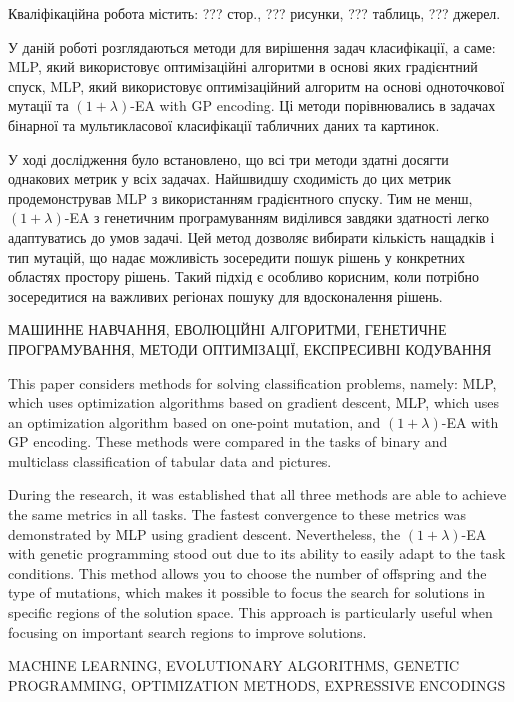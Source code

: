 
\abstractUkr

Кваліфікаційна робота містить: ??? стор., ??? рисунки, ??? таблиць, ??? джерел.

У даній роботі розглядаються методи для вирішення задач класифікації, а саме: MLP, який використовує оптимізаційні алгоритми в основі яких градієнтний спуск, MLP, який використовує оптимізаційний алгоритм на основі одноточкової мутації та $(1+\lambda)$-EA with GP encoding. Ці методи порівнювались в задачах бінарної та мультикласової класифікації табличних даних та картинок.

У ході дослідження було встановлено, що всі три методи здатні досягти однакових метрик у всіх задачах. Найшвидшу сходимість до цих метрик продемонстрував MLP з використанням градієнтного спуску. Тим не менш, $(1+\lambda)$-EA з генетичним програмуванням виділився завдяки здатності легко адаптуватись до умов задачі. Цей метод дозволяє вибирати кількість нащадків і тип мутацій, що надає можливість зосередити пошук рішень у конкретних областях простору рішень. Такий підхід є особливо корисним, коли потрібно зосередитися на важливих регіонах пошуку для вдосконалення рішень.


\MakeUppercase{МАШИННЕ НАВЧАННЯ, ЕВОЛЮЦІЙНІ АЛГОРИТМИ, ГЕНЕТИЧНЕ ПРОГРАМУВАННЯ, МЕТОДИ ОПТИМІЗАЦІЇ, ЕКСПРЕСИВНІ КОДУВАННЯ}


%

\abstractEng

This paper considers methods for solving classification problems, namely: MLP, which uses optimization algorithms based on gradient descent, MLP, which uses an optimization algorithm based on one-point mutation, and $(1+\lambda)$-EA with GP encoding. These methods were compared in the tasks of binary and multiclass classification of tabular data and pictures.

During the research, it was established that all three methods are able to achieve the same metrics in all tasks. The fastest convergence to these metrics was demonstrated by MLP using gradient descent. Nevertheless, the $(1+\lambda)$-EA with genetic programming stood out due to its ability to easily adapt to the task conditions. This method allows you to choose the number of offspring and the type of mutations, which makes it possible to focus the search for solutions in specific regions of the solution space. This approach is particularly useful when focusing on important search regions to improve solutions.

\MakeUppercase{MACHINE LEARNING, EVOLUTIONARY ALGORITHMS, GENETIC PROGRAMMING, OPTIMIZATION METHODS, EXPRESSIVE ENCODINGS}

\clearpage